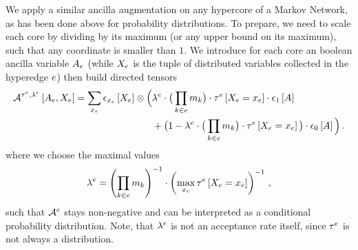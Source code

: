 We apply a similar ancilla augmentation on any hypercore of a Markov Network, as has been done above for probability distributions.
To prepare, we need to scale each core by dividing by its maximum (or any upper bound on its maximum), such that any coordinate is smaller than $1$.
We introduce for each core an boolean ancilla variable $A_{e}$ (while $X_{e}$ is the tuple of distributed variables collected in the hyperedge $e$) then build directed tensors
\begin{align*}
    \anaugmentationofat{\hypercoreof{\edge},\acceptanceprobof{\edge}}{\avariableof{\edge},\catvariableof{\edge}}
    =    %
    \sum_{\catindexof{\edge}} \onehotmapofat{\catindexof{\edge}}{\catvariableof{\edge}}
    \otimes \Big(&
    \acceptanceprobof{\edge} \cdot \big(\prod_{\catenumerator\in\edge}\catdimof{\catenumerator}\big) \cdot \hypercoreofat{\edge}{\indexedcatvariableof{\edge}} \cdot
    \tbasisat{\avariable} \\
    &+ \big(1- \acceptanceprobof{\edge} \cdot \big(\prod_{\catenumerator\in\edge}\catdimof{\catenumerator}\big) \cdot \hypercoreofat{\edge}{\indexedcatvariableof{\edge}}
    \big) \cdot
    \fbasisat{\avariable}
    \Big) \, .
\end{align*}
where we choose the maximal values
\begin{align*}
    \lambda^{e}
    = \left(\prod_{k\in e}m_{k}\right)^{-1}
    \cdot \left(\max_{x_{e}}\tau^{e}\left[X_{e}=x_{e}\right]\right)^{-1} \, ,
\end{align*}
such that $\mathcal{A}^{e}$ stays non-negative and can be interpreted as a conditional probability distribution.
Note, that $\lambda^{e}$ is not an acceptance rate itself, since $\tau^{e}$ is not always a distribution.

